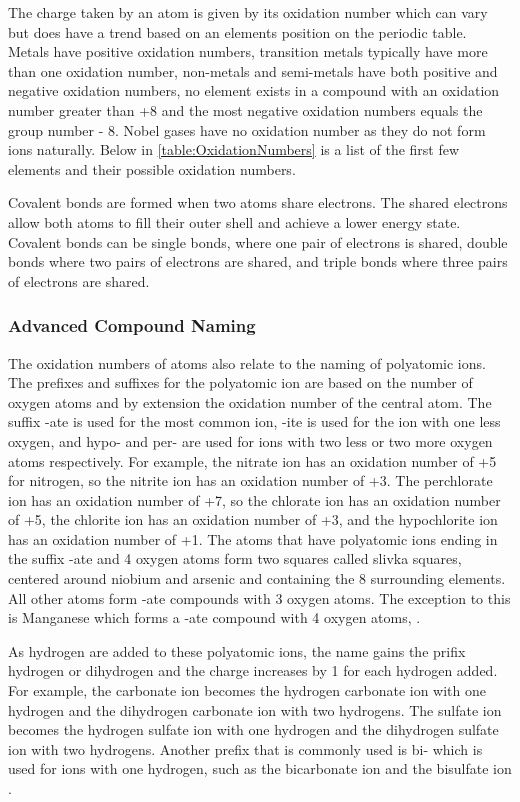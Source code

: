     The charge taken by an atom is given by its oxidation number which can vary but does have a trend based on an elements position on the periodic table. Metals have positive oxidation numbers, transition metals typically have more than one oxidation number, non-metals and semi-metals have both positive and negative oxidation numbers, no element exists in a compound with an oxidation number greater than +8 and the most negative oxidation numbers equals the group number - 8. Nobel gases have no oxidation number as they do not form ions naturally. Below in \ref{table:OxidationNumbers} is a list of the first few elements and their possible oxidation numbers.
    
    Covalent bonds are formed when two atoms share electrons. The shared electrons allow both atoms to fill their outer shell and achieve a lower energy state. Covalent bonds can be single bonds, where one pair of electrons is shared, double bonds where two pairs of electrons are shared, and triple bonds where three pairs of electrons are shared. 
    \subsubsection{Advanced Compound Naming}
    The oxidation numbers of atoms also relate to the naming of polyatomic ions. The prefixes and suffixes for the polyatomic ion are based on the number of oxygen atoms and by extension the oxidation number of the central atom. The suffix -ate is used for the most common ion, -ite is used for the ion with one less oxygen, and hypo- and per- are used for ions with two less or two more oxygen atoms respectively. For example, the nitrate ion  has an oxidation number of +5 for nitrogen, so the nitrite ion  has an oxidation number of +3. The perchlorate ion  has an oxidation number of +7, so the chlorate ion  has an oxidation number of +5, the chlorite ion  has an oxidation number of +3, and the hypochlorite ion  has an oxidation number of +1. The atoms that have polyatomic ions ending in the suffix -ate and 4 oxygen atoms form two squares called slivka squares, centered around niobium and arsenic and containing the 8 surrounding elements. All other atoms form -ate compounds with 3 oxygen atoms. The exception to this is Manganese which forms a -ate compound with 4 oxygen atoms, . 
    
    As hydrogen are added to these polyatomic ions, the name gains the prifix hydrogen or dihydrogen and the charge increases by 1 for each hydrogen added. For example, the carbonate ion  becomes the hydrogen carbonate ion  with one hydrogen and the dihydrogen carbonate ion  with two hydrogens. The sulfate ion  becomes the hydrogen sulfate ion  with one hydrogen and the dihydrogen sulfate ion  with two hydrogens. Another prefix that is commonly used is bi- which is used for ions with one hydrogen, such as the bicarbonate ion  and the bisulfate ion .

